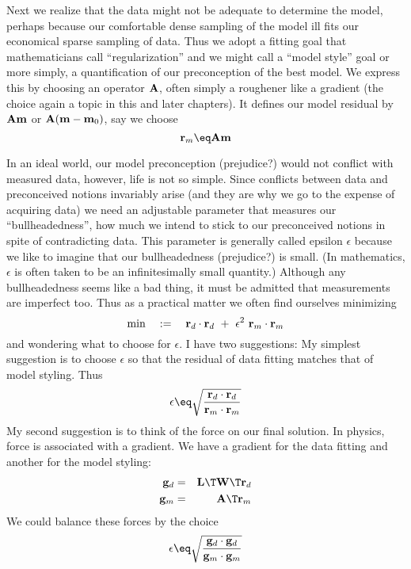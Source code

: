 \par
Next we realize that the data might not be adequate to determine the model,
perhaps because our comfortable dense sampling of the model
ill fits our economical sparse sampling of data.
Thus we adopt a fitting goal that mathematicians call ``regularization''
and we might call a ``model style'' goal
or more simply,
a quantification of our preconception of the best model.
We express this by choosing an operator $\bold A$,
often simply a roughener like a gradient
(the choice again a topic in this and later chapters).
It defines our model residual by
$\bold A \bold m$ or
$\bold A ( \bold m-\bold m_0)$, say we choose
\begin{equation}
\bold r_m \eq \bold A \bold m 
\end{equation}

\par
In an ideal world, our model preconception (prejudice?) would not conflict
with measured data, however,
life is not so simple.
Since conflicts between data and preconceived notions invariably arise
(and they are why we go to the expense of acquiring data)
we need an adjustable parameter
that measures our ``bullheadedness'', how much we intend
to stick to our preconceived notions in spite of contradicting data.
This parameter is generally called epsilon $\epsilon$
because we like to imagine that our bullheadedness (prejudice?) is small.
(In mathematics, $\epsilon$ is often taken to be
an infinitesimally small quantity.)
Although any bullheadedness seems like a bad thing,
it must be admitted that measurements are imperfect too.
Thus as a practical matter we often find ourselves minimizing
\begin{equation}
\min \quad := \quad
\bold r_d \cdot \bold r_d \ +\  \epsilon^2\ \bold r_m \cdot \bold r_m 
\end{equation}
and wondering what to choose for $\epsilon$.
I have two suggestions:
My simplest suggestion is to choose $\epsilon$
so that the residual of data fitting matches that of model styling.
Thus
\begin{equation}
\epsilon \eq \sqrt{\frac{ \bold r_d \cdot \bold r_d }{ \bold r_m \cdot \bold r_m }}
\end{equation}
My second suggestion is to think of the force on our final solution.
In physics, force is associated with a gradient.
We have a gradient for the data fitting
and another for the model styling:
\begin{eqnarray}
\bold g_d &=& \bold L\T \bold W\T \bold r_d  \\
\bold g_m &=& \bold A\T \bold r_m
\end{eqnarray}
We could balance these forces by the choice
\begin{equation}
\epsilon \eq \sqrt{
\bold g_d \cdot \bold g_d
\over
\bold g_m \cdot \bold g_m 
}
\end{equation}


